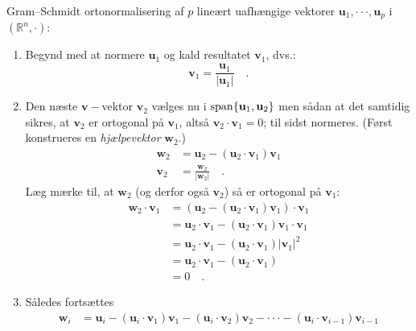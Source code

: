 \begin{method}
Gram--Schmidt ortonormalisering af $p$ lineært uafhængige vektorer $\mathbf{u}_{1}, \cdot  \cdot \cdot, \mathbf{u}_{p}$ i $(\mathbb{R}^{n}, \cdot)$:
\begin{enumerate}
\item Begynd med at normere $\mathbf{u}_{1}$ og kald resultatet $\mathbf{v}_{1}$, dvs.:
\begin{equation}
\mathbf{v}_{1} = \frac{\mathbf{u}_{1}}{\vert \mathbf{u}_{1} \vert} \quad .
\end{equation}
\item Den næste $\mathbf{v}-$vektor $\mathbf{v}_{2}$ vælges nu i $\mathrm{span}\{\mathbf{u}_{1}, \mathbf{u}_{2}\}$ men sådan at det samtidig sikres, at $\mathbf{v}_{2}$ er ortogonal på $\mathbf{v}_{1}$, altså $\mathbf{v}_{2}\cdot \mathbf{v}_{1} = 0$; til sidst normeres. (Først konstrueres en {\em{hjælpevektor}} $\mathbf{w}_{2}$.)
\begin{equation}
\begin{aligned}
\mathbf{w}_{2} &= \mathbf{u}_{2} - \left(\mathbf{u}_{2} \cdot \mathbf{v}_{1}\right)\mathbf{v}_{1} \\
\mathbf{v}_{2} &= \frac{\mathbf{w}_{2}}{\vert \mathbf{w}_{2} \vert} \quad .
\end{aligned}
\end{equation}
Læg mærke til, at $\mathbf{w}_{2}$ (og derfor også $\mathbf{v}_{2}$) så er ortogonal på $\mathbf{v}_{1}$:
\begin{equation}
\begin{aligned}
\mathbf{w}_{2} \cdot \mathbf{v}_{1} &= \left(\mathbf{u}_{2} - \left(\mathbf{u}_{2} \cdot \mathbf{v}_{1}\right)\mathbf{v}_{1}\right) \cdot \mathbf{v}_{1} \\
&= \mathbf{u}_{2} \cdot \mathbf{v}_{1} - \left(\mathbf{u}_{2} \cdot \mathbf{v}_{1} \right) \mathbf{v}_{1} \cdot \mathbf{v}_{1} \\
&= \mathbf{u}_{2} \cdot \mathbf{v}_{1} - \left(\mathbf{u}_{2} \cdot \mathbf{v}_{1} \right) \vert \mathbf{v}_{1} \vert^{2} \\
&=  \mathbf{u}_{2} \cdot \mathbf{v}_{1} - \left(\mathbf{u}_{2} \cdot \mathbf{v}_{1} \right)\\
&= 0 \quad .
\end{aligned}
\end{equation}
\item Således fortsættes
\begin{equation}
\begin{aligned}
\mathbf{w}_{i} &= \mathbf{u}_{i} -  \left(\mathbf{u}_{i} \cdot \mathbf{v}_{1}\right)\mathbf{v}_{1} - \left(\mathbf{u}_{i} \cdot \mathbf{v}_{2}\right)\mathbf{v}_{2} - \cdot \cdot \cdot -\left(\mathbf{u}_{i} \cdot \mathbf{v}_{i-1}\right)\mathbf{v}_{i-1}\\

\end{aligned}
\end{equation}
\end{enumerate}
\end{method}
